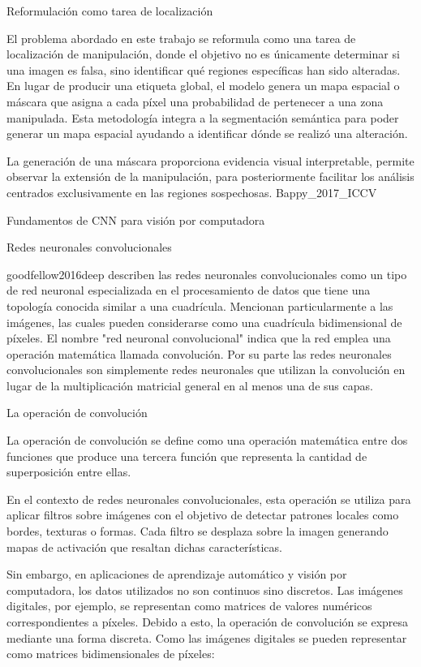 Reformulación como tarea de localización


El problema abordado en este trabajo se reformula como una tarea de localización de manipulación, donde el objetivo no es únicamente determinar si una imagen es falsa, sino identificar qué regiones específicas han sido alteradas. En lugar de producir una etiqueta global, el modelo genera un mapa espacial o máscara que asigna a cada píxel una probabilidad de pertenecer a una zona manipulada. Esta metodología integra a la segmentación semántica para poder generar un mapa espacial ayudando a identificar dónde se realizó una alteración.

La generación de una máscara proporciona evidencia visual interpretable, permite observar la extensión de la manipulación, para posteriormente facilitar los análisis centrados exclusivamente en las regiones sospechosas. Bappy_2017_ICCV

Fundamentos de CNN para visión por computadora


Redes neuronales convolucionales


goodfellow2016deep describen las redes neuronales convolucionales como un tipo de red neuronal especializada en el procesamiento de datos que tiene una topología conocida similar a una cuadrícula. Mencionan particularmente a las imágenes, las cuales pueden considerarse como una cuadrícula bidimensional de píxeles. El nombre "red neuronal convolucional" indica que la red emplea una operación matemática llamada convolución. Por su parte las redes neuronales convolucionales son simplemente redes neuronales que utilizan la convolución en lugar de la multiplicación matricial general en al menos una de sus capas. 


La operación de convolución


La operación de convolución se define como una operación matemática entre dos funciones que produce una tercera función que representa la cantidad de superposición entre ellas.

En el contexto de redes neuronales convolucionales, esta operación se utiliza para aplicar filtros sobre imágenes con el objetivo de detectar patrones locales como bordes, texturas o formas. Cada filtro se desplaza sobre la imagen generando mapas de activación que resaltan dichas características.

Sin embargo, en aplicaciones de aprendizaje automático y visión por computadora, los datos utilizados no son continuos sino discretos. Las imágenes digitales, por ejemplo, se representan como matrices de valores numéricos correspondientes a píxeles. Debido a esto, la operación de convolución se expresa mediante una forma discreta. Como las imágenes digitales se pueden representar como matrices bidimensionales de píxeles:


